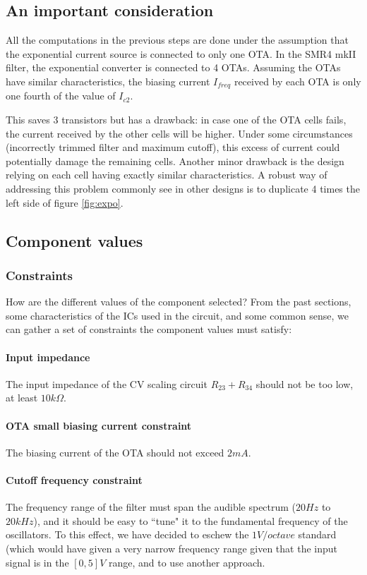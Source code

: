 \documentclass[a4paper,11pt]{article}
\begin{document}
\subsection{An important consideration}

All the computations in the previous steps are done under the assumption that the exponential current source is connected to only one OTA. In the SMR4 mkII filter, the exponential converter is connected to 4 OTAs. Assuming the OTAs have similar characteristics, the biasing current $I_{freq}$ received by each OTA is only one fourth of the value of $I_{c2}$.

This saves 3 transistors but has a drawback: in case one of the OTA cells fails, the current received by the other cells will be higher. Under some circumstances (incorrectly trimmed filter and maximum cutoff), this excess of current could potentially damage the remaining cells. Another minor drawback is the design relying on each cell having exactly similar characteristics. A robust way of addressing this problem commonly see in other designs is to duplicate 4 times the left side of figure \ref{fig:expo}.

\subsection{Component values}

\subsubsection{Constraints}

How are the different values of the component selected? From the past sections, some characteristics of the ICs used in the circuit, and some common sense, we can gather a set of constraints the component values must satisfy:

\paragraph{Input impedance} The input impedance of the CV scaling circuit $R_{23} + R_{34}$ should not be too low, at least $10k \Omega$.

\paragraph{OTA small biasing current constraint} The biasing current of the OTA should not exceed $2mA$.

\paragraph{Cutoff frequency constraint} The frequency range of the filter must span the audible spectrum ($20 Hz$ to $20kHz$), and it should be easy to ``tune" it to the fundamental frequency of the oscillators. To this effect, we have decided to eschew the $1 V/octave$ standard (which would have given a very narrow frequency range given that the input signal is in the $[0, 5]V$ range, and to use another approach.
\end{document}
